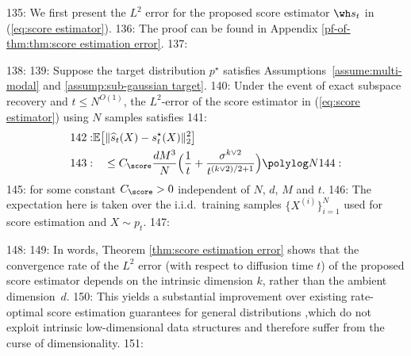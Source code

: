 135: We first present the $L^2$ error for the proposed score estimator $\wh s_t$ in (\ref{eq:score estimator}).
136: The proof can be found in Appendix \ref{pf-of-thm:thm:score estimation error}.
137: \begin{theorem}
138:     \label{thm:score estimation error}
139:     Suppose the target distribution $p^\star$ satisfies Assumptions~\ref{assume:multi-modal} and \ref{assump:sub-gaussian target}.
140:     Under the event of exact subspace recovery and $t\leq N^{O(1)}$, the $L^2$-error of the score estimator in (\ref{eq:score estimator}) using $N$ samples satisfies
141:     \begin{align*}
142:         &\mathbb{E}\big[\|\widehat{s}_t(X)-s_t^\star(X)\|_2^2\big] \\
143:         & \quad \leq  C_\score \frac{dM^3}{N} \Big( \frac{1}{t}+\frac{\sigma^{k\vee2}}{t^{{(k\vee2)}/2+1}}\Big)  \polylog N 
144:     \end{align*}
145:     for some constant $C_\score >0$ independent of $N$, $d$, $M$ and $t$.
146:     The expectation here is taken over the i.i.d.\ training samples $\{ X^{(i)}\}_{i=1}^N$ used for score estimation and $X \sim p_t$.
147: \end{theorem}
148: 
149: In words, Theorem \ref{thm:score estimation error} shows that the convergence rate of the $L^2$ error (with respect to diffusion time $t$) of the proposed score estimator depends on the intrinsic dimension $k$, rather than the ambient dimension~$d$. 
150: This yields a substantial improvement over existing rate-optimal score estimation guarantees for general distributions  \citep{wibisono2024optimal,zhang2024minimaxoptimalityscorebaseddiffusion,dou2024optimalscorematchingoptimal,cai2025minimaxoptimalityprobabilityflow},which do not exploit intrinsic low-dimensional data structures and therefore suffer from the curse of dimensionality. 
151: 
